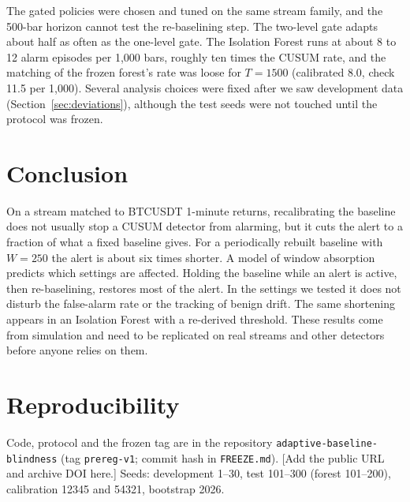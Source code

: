 \documentclass[11pt]{article}
\begin{document}
The gated policies were chosen and tuned on the same stream family, and the 500-bar horizon cannot test the re-baselining step. The two-level gate adapts about half as often as the one-level gate. The Isolation Forest runs at about 8 to 12 alarm episodes per 1{,}000 bars, roughly ten times the CUSUM rate, and the matching of the frozen forest's rate was loose for $T=1500$ (calibrated 8.0, check 11.5 per 1{,}000). Several analysis choices were fixed after we saw development data (Section~\ref{sec:deviations}), although the test seeds were not touched until the protocol was frozen.

\section{Conclusion}

On a stream matched to BTCUSDT 1-minute returns, recalibrating the baseline does not usually stop a CUSUM detector from alarming, but it cuts the alert to a fraction of what a fixed baseline gives. For a periodically rebuilt baseline with $W=250$ the alert is about six times shorter. A model of window absorption predicts which settings are affected. Holding the baseline while an alert is active, then re-baselining, restores most of the alert. In the settings we tested it does not disturb the false-alarm rate or the tracking of benign drift. The same shortening appears in an Isolation Forest with a re-derived threshold. These results come from simulation and need to be replicated on real streams and other detectors before anyone relies on them.

\section*{Reproducibility}
Code, protocol and the frozen tag are in the repository \texttt{adaptive-baseline-blindness} (tag \texttt{prereg-v1}; commit hash in \texttt{FREEZE.md}). [Add the public URL and archive DOI here.] Seeds: development 1--30, test 101--300 (forest 101--200), calibration 12345 and 54321, bootstrap 2026.
\end{document}

